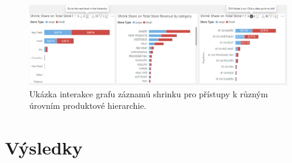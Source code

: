 \begin{figure}[hbtp!]
    \centering
    \captionsetup{justification=centering}
    \includegraphics[width=\textwidth]{obrazky/PBI/Catdrilldown.png}
    \caption{Ukázka interakce grafu záznamů shrinku pro přístupy k různým úrovním produktové hierarchie.}
    \label{obr:PBI:drill}
\end{figure}

\section{Výsledky}
\label{sec:vizualizace:vysl}

